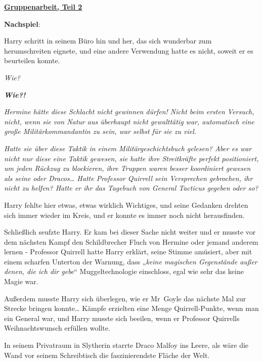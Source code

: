 

\hypertarget{gruppenarbeit-teil-2}{%

\textbf{\uline{Gruppenarbeit, Teil 2}}

\textbf{Nachspiel}:

Harry schritt in seinem Büro hin und her, das sich wunderbar zum herumschreiten eignete, und eine andere Verwendung hatte es nicht, soweit er es beurteilen konnte.

\emph{Wie?}

\textbf{\emph{Wie?!}}

\emph{Hermine hätte diese Schlacht nicht gewinnen dürfen! Nicht beim ersten Versuch, nicht, wenn sie von Natur aus überhaupt nicht gewalttätig war, automatisch eine große Militärkommandantin zu sein, war selbst für sie zu viel.}

\emph{\hfill\break Hatte sie über diese Taktik in einem Militärgeschichtsbuch gelesen? Aber es war nicht nur diese eine Taktik gewesen, sie hatte ihre Streitkräfte perfekt positioniert, um jeden Rückzug zu blockieren, ihre Truppen waren besser koordiniert gewesen als seine oder Dracos… Hatte Professor Quirrell sein Versprechen gebrochen, ihr nicht zu helfen? Hatte er ihr das Tagebuch von General Tacticus gegeben oder so?}

Harry fehlte hier etwas, etwas wirklich Wichtiges, und seine Gedanken drehten sich immer wieder im Kreis, und er konnte es immer noch nicht herausfinden.

Schließlich seufzte Harry. Er kam bei dieser Sache nicht weiter und er musste vor dem nächsten Kampf den Schildbrecher Fluch von Hermine oder jemand anderem lernen - Professor Quirrell hatte Harry erklärt, seine Stimme amüsiert, aber mit einem scharfen Unterton der Warnung, dass „\emph{keine magischen Gegenstände außer denen, die ich dir gebe}“ Muggeltechnologie einschloss, egal wie sehr das keine Magie war.

Außerdem musste Harry sich überlegen, wie er Mr~Goyle das nächste Mal zur Strecke bringen konnte… Kämpfe erzielten eine Menge Quirrell-Punkte, wenn man ein General war, und Harry musste sich beeilen, wenn er Professor Quirrells Weihnachtswunsch erfüllen wollte.

In seinem Privatraum in Slytherin starrte Draco Malfoy ins Leere, als wäre die Wand vor seinem Schreibtisch die faszinierendste Fläche der Welt.

}
